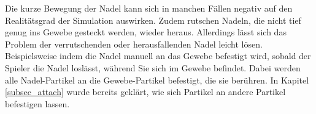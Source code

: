 Die kurze Bewegung der Nadel kann sich in manchen Fällen negativ auf den Realitätsgrad der Simulation auswirken. Zudem rutschen Nadeln, die nicht tief genug ins Gewebe gesteckt werden, wieder heraus. Allerdings lässt sich das Problem der verrutschenden oder herausfallenden Nadel leicht lösen. Beispielsweise indem die Nadel manuell an das Gewebe befestigt wird, sobald der Spieler die Nadel loslässt, während Sie sich im Gewebe befindet. Dabei werden alle Nadel-Partikel an die Gewebe-Partikel befestigt, die sie berühren. In Kapitel \ref{subsec_attach} wurde bereits geklärt, wie sich Partikel an andere Partikel befestigen lassen. 

% 

%

